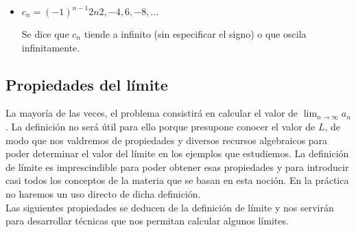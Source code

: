 \documentclass[../Teoría.root.tex]{subfiles}
\begin{document}
\begin{itemize}
\begin{center}
\begin{scaletikzpicturetowidth}{.5\linewidth}
            \end{scaletikzpicturetowidth}
        \end{center}
        \[\lim_{n\to\infty}b_n\,\text{no existe}\] En este caso se dice que \(a_n\) oscila finitamente.
        \item \(c_n=(-1)^{n-1}2n\)\tab\(2,-4,6,-8,\dots\)
        \begin{center}
            \begin{scaletikzpicturetowidth}{.5\linewidth}
            \end{scaletikzpicturetowidth}
        \end{center}
        Se dice que \(c_n\) tiende a infinito (sin especificar el signo) o que oscila infinitamente.
    \end{itemize}
    \subsection{Propiedades del límite}
    La mayoría de las veces, el problema consistirá en calcular el valor de \(\lim_{n\to\infty}a_n\). La definición no será útil para ello porque presupone conocer el valor de \(L\), de modo que nos valdremos de propiedades y diversos recursos algebraicos para poder determinar el valor del límite en los ejemplos que estudiemos. La definición de límite es imprescindible para poder obtener esas propiedades y para introducir casi todos los conceptos de la materia que se basan en esta noción. En la práctica no haremos un uso directo de dicha definición.\\
    Las siguientes propiedades se deducen de la definición de límite y nos servirán para desarrollar técnicas que nos permitan calcular algunos límites.
\end{document}

